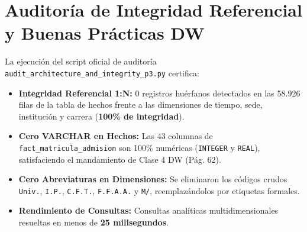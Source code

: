 \documentclass[11pt,a4paper]{article}
\begin{document}
\section{Auditoría de Integridad Referencial y Buenas Prácticas DW}

La ejecución del script oficial de auditoría \texttt{audit\_architecture\_and\_integrity\_p3.py} certifica:
\begin{itemize}
    \item \textbf{Integridad Referencial 1:N:} 0 registros huérfanos detectados en las 58.926 filas de la tabla de hechos frente a las dimensiones de tiempo, sede, institución y carrera (\textbf{100\% de integridad}).
    \item \textbf{Cero VARCHAR en Hechos:} Las 43 columnas de \texttt{fact\_matricula\_admision} son 100\% numéricas (\texttt{INTEGER} y \texttt{REAL}), satisfaciendo el mandamiento de Clase 4 DW (Pág. 62).
    \item \textbf{Cero Abreviaturas en Dimensiones:} Se eliminaron los códigos crudos \texttt{Univ.}, \texttt{I.P.}, \texttt{C.F.T.}, \texttt{F.F.A.A.} y \texttt{M/}, reemplazándolos por etiquetas formales.
    \item \textbf{Rendimiento de Consultas:} Consultas analíticas multidimensionales resueltas en menos de \textbf{25 milisegundos}.
\end{itemize}
\end{document}
